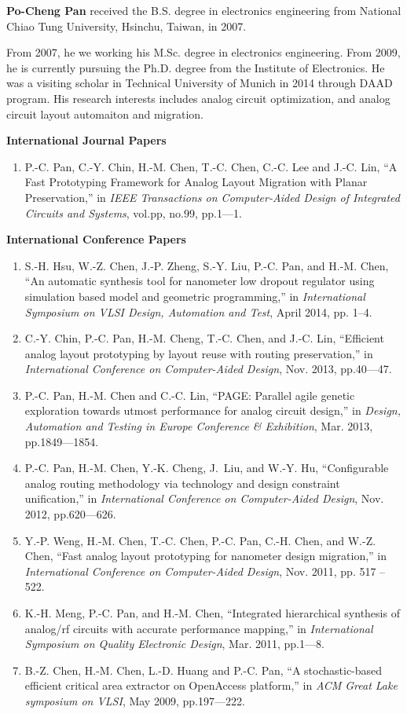 
{\bf Po-Cheng Pan} received the B.S. degree in electronics engineering from National Chiao Tung University, Hsinchu, Taiwan, in 2007. 

From 2007, he we working his M.Sc. degree in electronics engineering. From 2009, he is currently pursuing the Ph.D. degree from the Institute of Electronics. He was a visiting scholar in Technical University of Munich in 2014 through DAAD program. His research interests includes analog circuit optimization, and analog circuit layout automaiton and migration. 

{\bf International Journal Papers}
\begin{enumerate}
  \item P.-C. Pan, C.-Y. Chin, H.-M. Chen, T.-C. Chen, C.-C. Lee and J.-C. Lin, ``A Fast Prototyping Framework for Analog Layout Migration with Planar Preservation,'' in \emph{IEEE Transactions on Computer-Aided Design of Integrated Circuits and Systems}, vol.pp, no.99, pp.1---1. 
\end{enumerate}
{\bf International Conference Papers}
\begin{enumerate}
  \item S.-H. Hsu, W.-Z. Chen, J.-P. Zheng, S.-Y. Liu, P.-C. Pan, and H.-M. Chen, ``An automatic synthesis tool for nanometer low dropout regulator using simulation based model and geometric programming,'' in \emph{International Symposium on VLSI Design, Automation and Test}, April 2014, pp. 1--4.
  \item C.-Y. Chin, P.-C. Pan, H.-M. Cheng, T.-C. Chen, and J.-C. Lin, ``Efficient analog layout prototyping by layout reuse with routing preservation,'' in \emph{International Conference on Computer-Aided Design}, Nov. 2013, pp.40---47.
  \item P.-C. Pan, H.-M. Chen and C.-C. Lin, ``PAGE: Parallel agile genetic exploration towards utmost performance for analog circuit design,'' in \emph{Design, Automation and Testing in Europe Conference \& Exhibition}, Mar. 2013, pp.1849---1854.
  \item P.-C. Pan, H.-M. Chen, Y.-K. Cheng, J.~Liu, and W.-Y. Hu, ``Configurable analog routing methodology via technology and design constraint unification,'' in \emph{International Conference on Computer-Aided Design}, Nov. 2012, pp.620---626.
  \item Y.-P. Weng, H.-M. Chen, T.-C. Chen, P.-C. Pan, C.-H. Chen, and W.-Z. Chen, ``Fast analog layout prototyping for nanometer design migration,'' in \emph{International Conference on Computer-Aided Design}, Nov. 2011, pp. 517 -- 522.
  \item K.-H. Meng, P.-C. Pan, and H.-M. Chen, ``Integrated hierarchical synthesis of analog/rf circuits with accurate performance mapping,'' in \emph{International Symposium on Quality Electronic Design}, Mar. 2011, pp.1---8. 
  \item B.-Z. Chen, H.-M. Chen, L.-D. Huang and P.-C. Pan, ``A stochastic-based efficient critical area extractor on OpenAccess platform,'' in \emph{ACM Great Lake symposium on VLSI}, May 2009, pp.197---222.
\end{enumerate}
